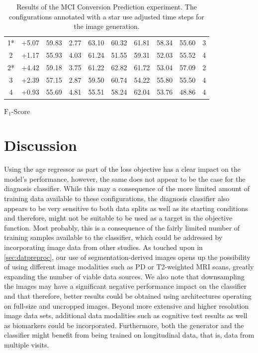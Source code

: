 \begin{table}[h]
\begin{center}
\begin{tabular}{c c c c c c c c c c}
			1*              & +5.07  & 59.83 & 2.77 & 63.10 & 60.32 & 61.81 & 58.34 & 55.60 & 3 \\
			2\hphantom{*}   & +1.17  & 55.93 & 4.03 & 61.24 & 51.55 & 59.31 & 52.03 & 55.52 & 4 \\
			2*              & +4.42  & 59.18 & 3.75 & 61.22 & 62.82 & 61.72 & 53.04 & 57.09 & 2 \\
			3\hphantom{*}   & +2.39  & 57.15 & 2.87 & 59.50 & 60.74 & 54.22 & 55.80 & 55.50 & 4 \\
			4\hphantom{*}   & +0.93  & 55.69 & 4.81 & 55.51 & 58.24 & 62.04 & 53.76 & 48.86 & 4 \\
			\bottomrule
		\end{tabular}
		\caption*{$\text{F}_1$-Score}
	\end{center}
	\caption{Results of the MCI Conversion Prediction experiment. The configurations annotated with a star use adjusted time steps for the image generation.}
	\label{tab:expconv}
\end{table}

\chapter{Discussion}

Using the age regressor as part of the loss objective has a clear impact on the model's performance, however, the same does not appear to be the case for the diagnosis classifier. While this may a consequence of the more limited amount of training data available to these configurations, the diagnosis classifier also appears to be very sensitive to both data splits as well as its starting conditions and therefore, might not be suitable to be used as a target in the objective function. Most probably, this is a consequence of the fairly limited number of training samples available to the classifier, which could be addressed by incorporating image data from other studies. As touched upon in \autoref{sec:datpreproc}, our use of segmentation-derived images opens up the possibility of using different image modalities such as PD or T2-weighted MRI scans, greatly expanding the number of viable data sources.
We also note that downsampling the images may have a significant negative performance impact on the classifier and that therefore, better results could be obtained using architectures operating on full-size and uncropped images.
Beyond more extensive and higher resolution image data sets, additional data modalities such as cognitive test results as well as biomarkers could be incorporated. Furthermore, both the generator and the classifier might benefit from being trained on longitudinal data, that is, data from multiple visits.

